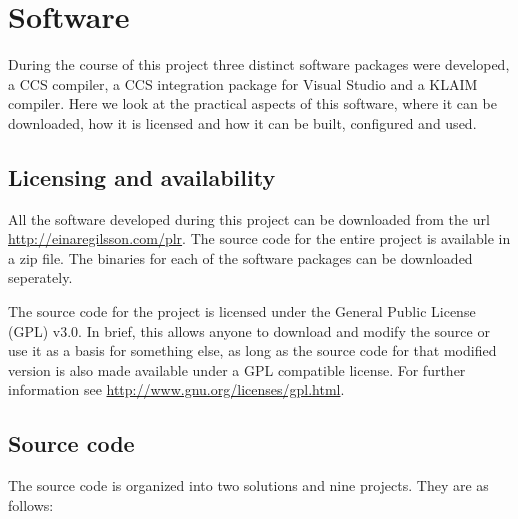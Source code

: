 \appendix

\chapter{Software}

	During the course of this project three distinct software packages were 
	developed, a CCS compiler, a CCS integration package for Visual Studio and a 
	KLAIM compiler. Here we look at the practical aspects of this software, 
	where it can be downloaded, how it is licensed and how it can be built, 
	configured and used.

\section{Licensing and availability}

	All the software developed during this project can be downloaded from the 
	url \url{http://einaregilsson.com/plr}. The source code for the entire 
	project is available in a zip file. The binaries for each of the software 
	packages can be downloaded seperately. 
	
	The source code for the project is licensed under the General Public License 
	(GPL) v3.0. In brief, this allows anyone to download and modify the source or
	use it as a basis for something else, as long as the source code for that 
	modified version is also made available under a GPL compatible license. For 
	further information see \url{http://www.gnu.org/licenses/gpl.html}.


\section{Source code}
	
	The source code is organized into two solutions and nine projects. They are 
	as follows:
	
